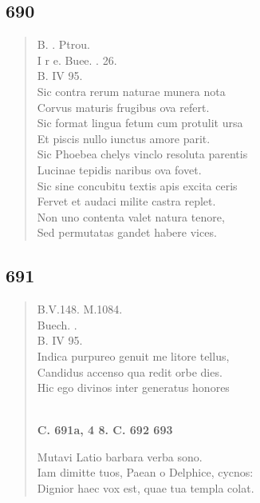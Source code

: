\documentclass[11pt, a4paper]{report}
\begin{document}
            \subsection*{690}
      \begin{verse}
      B. . Ptrou. \\ I r e. Buee. . 26. \\ B. IV 95. \\ Sic contra rerum naturae munera nota \\ Corvus maturis frugibus ova refert. \\ Sic format lingua fetum cum protulit ursa \\ Et piscis nullo iunctus amore parit. \\ Sic Phoebea chelys vinclo resoluta parentis \\ Lucinae tepidis naribus ova fovet. \\ Sic sine concubitu textis apis excita ceris \\ Fervet et audaci milite castra replet. \\ Non uno contenta valet natura tenore, \\ Sed permutatas gandet habere vices. \\ 
      \end{verse}
  
            \subsection*{691}
      \begin{verse}
      B.V.148. M.1084. \\ Buech. . \\ B. IV 95. \\ Indica purpureo genuit me litore tellus, \\ Candidus accenso qua redit orbe dies. \\ Hic ego divinos inter generatus honores \\ 
        ﻿\pagebreak 
    \begin{center} \textbf{C. 691a, 4 8. C. 692 693} \end{center} \marginpar{[168]} Mutavi Latio barbara verba sono. \\ Iam dimitte tuos, Paean o Delphice, cycnos: \\ Dignior haec vox est, quae tua templa colat. \\ 
      \end{verse}
  
\end{document}
